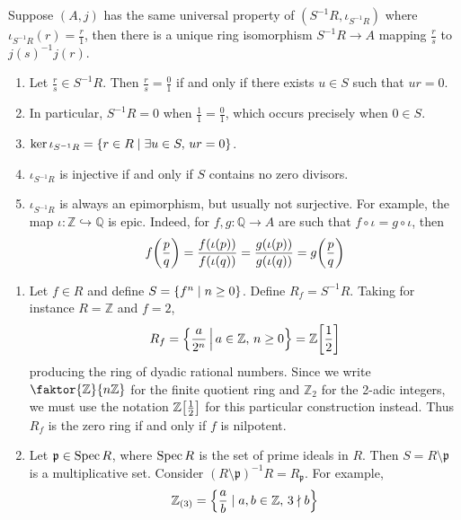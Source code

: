\begin{proposition}
    Suppose \( (A, j) \) has the same universal property of \( (S^{-1}R, \iota_{S^{-1}R}) \) where \( \iota_{S^{-1}R}(r) = \frac{r}{1} \), then there is a unique ring isomorphism \( S^{-1}R \to A \) mapping \( \frac{r}{s} \) to \( j(s)^{-1} j(r) \).
\end{proposition}
\begin{remark}
    \begin{enumerate}
        \item Let \( \frac{r}{s} \in S^{-1}R \).
        Then \( \frac{r}{s} = \frac{0}{1} \) if and only if there exists \( u \in S \) such that \( ur = 0 \).
        \item In particular, \( S^{-1}R = 0 \) when \( \frac{1}{1} = \frac{0}{1} \), which occurs precisely when \( 0 \in S \).
        \item \( \ker \iota_{S^{-1}R} = \qty{r \in R \mid \exists u \in S,\, ur = 0} \).
        \item \( \iota_{S^{-1}R} \) is injective if and only if \( S \) contains no zero divisors.
        \item \( \iota_{S^{-1}R} \) is always an epimorphism, but usually not surjective.
        For example, the map \( \iota : \mathbb Z \hookrightarrow \mathbb Q \) is epic.
        Indeed, for \( f, g : \mathbb Q \to A \) are such that \( f \circ \iota = g \circ \iota \), then
        \[ f\qty(\frac{p}{q}) = \frac{f(\iota(p))}{f(\iota(q))} = \frac{g(\iota(p))}{g(\iota(q))} = g\qty(\frac{p}{q}) \]
    \end{enumerate}
\end{remark}
\begin{example}
    \begin{enumerate}
        \item Let \( f \in R \) and define \( S = \qty{f^n \mid n \geq 0} \).
        Define \( R_f = S^{-1}R \).
        Taking for instance \( R = \mathbb Z \) and \( f = 2 \),
        \[ R_f = \qty{\frac{a}{2^n} \,\middle|\,a \in \mathbb Z,\, n \geq 0} = \mathbb Z\qty[\frac{1}{2}] \]
        producing the ring of dyadic rational numbers.
        Since we write \( \faktor{\mathbb Z}{n\mathbb Z} \) for the finite quotient ring and \( \mathbb Z_2 \) for the 2-adic integers, we must use the notation \( \mathbb Z\qty[\frac{1}{2}] \) for this particular construction instead.
        Thus \( R_f \) is the zero ring if and only if \( f \) is nilpotent.
        \item Let \( \mathfrak p \in \operatorname{Spec} R \), where \( \operatorname{Spec} R \) is the set of prime ideals in \( R \).
        Then \( S = R \setminus \mathfrak p \) is a multiplicative set.
        Consider \( (R \setminus \mathfrak p)^{-1} R = R_{\mathfrak p} \).
        For example,
        \[ \mathbb Z_{(3)} = \qty{\frac{a}{b} \mid a, b \in \mathbb Z,\, 3 \nmid b} \]
    \end{enumerate}
\end{example}

